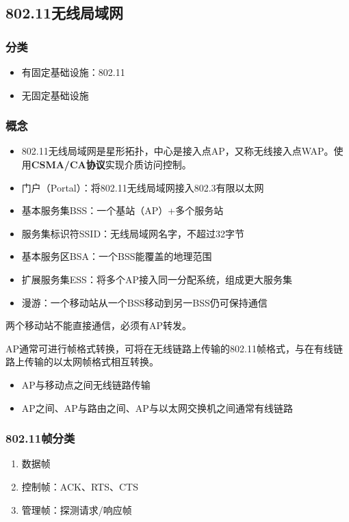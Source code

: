 \subsection{802.11无线局域网}

\subsubsection{分类}
\begin{itemize}
    \item 有固定基础设施：802.11
    \item 无固定基础设施
\end{itemize}


\subsubsection{概念}

\begin{itemize}
    \item 802.11无线局域网是星形拓扑，中心是接入点AP，又称无线接入点WAP。使用\textbf{CSMA/CA协议}实现介质访问控制。
    \item 门户（Portal）：将802.11无线局域网接入802.3有限以太网
    \item 基本服务集BSS：一个基站（AP）+多个服务站
    \item 服务集标识符SSID：无线局域网名字，不超过32字节
    \item 基本服务区BSA：一个BSS能覆盖的地理范围
    \item 扩展服务集ESS：将多个AP接入同一分配系统，组成更大服务集
    \item 漫游：一个移动站从一个BSS移动到另一BSS仍可保持通信
\end{itemize}
两个移动站不能直接通信，必须有AP转发。

AP通常可进行帧格式转换，可将在无线链路上传输的802.11帧格式，与在有线链路上传输的以太网帧格式相互转换。
\begin{itemize}
    \item AP与移动点之间无线链路传输
    \item AP之间、AP与路由之间、AP与以太网交换机之间通常有线链路
\end{itemize}


\subsubsection{802.11帧分类}
\begin{enumerate}
    \item 数据帧
    \item 控制帧：ACK、RTS、CTS
    \item 管理帧：探测请求/响应帧
\end{enumerate}



